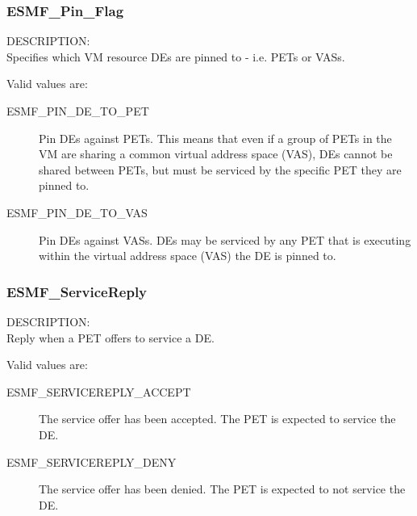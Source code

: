 

\subsubsection{ESMF\_Pin\_Flag}

\label{opt:depinflag}
{\sf DESCRIPTION:\\}
Specifies which VM resource DEs are pinned to - i.e. PETs or VASs.

Valid values are:
\begin{description}
  \item [ESMF\_PIN\_DE\_TO\_PET] 
    Pin DEs against PETs. This means that even if a group of PETs in the 
    VM are sharing a common virtual address space (VAS), DEs cannot
    be shared between PETs, but must be serviced by the specific PET they
    are pinned to.
  \item [ESMF\_PIN\_DE\_TO\_VAS]
    Pin DEs against VASs. DEs may be serviced by any PET that is 
    executing within the virtual address space (VAS) the DE is pinned to.
\end{description}


\subsubsection{ESMF\_ServiceReply}

\label{const:servicereply_flag}
{\sf DESCRIPTION:\\}
Reply when a PET offers to service a DE.

Valid values are:
\begin{description}
  \item [ESMF\_SERVICEREPLY\_ACCEPT] 
    The service offer has been accepted. The PET is expected to service the DE.
  \item [ESMF\_SERVICEREPLY\_DENY]
    The service offer has been denied. The PET is expected to not service the
    DE.
\end{description}

